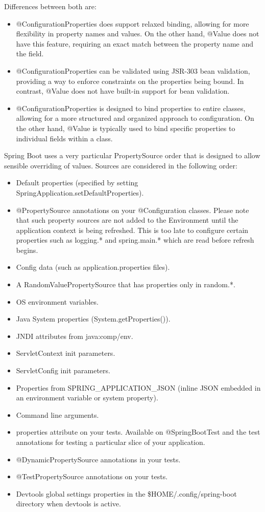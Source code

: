 \documentclass{scrartcl}
\begin{document}
Differences between both are:

\begin{itemize}
    \item @ConfigurationProperties does support relaxed binding, allowing for more flexibility in property names and values. On the other hand, @Value does not have this feature, requiring an exact match between the property name and the field.
    \item @ConfigurationProperties can be validated using JSR-303 bean validation, providing a way to enforce constraints on the properties being bound. In contrast, @Value does not have built-in support for bean validation.
    \item @ConfigurationProperties is designed to bind properties to entire classes, allowing for a more structured and organized approach to configuration. On the other hand, @Value is typically used to bind specific properties to individual fields within a class.
\end{itemize}

Spring Boot uses a very particular PropertySource order that is designed to allow sensible overriding of values. Sources are considered in the following order:

\begin{itemize}
    \item Default properties (specified by setting SpringApplication.setDefaultProperties).
    \item @PropertySource annotations on your @Configuration classes. Please note that such property sources are not added to the Environment until the application context is being refreshed. This is too late to configure certain properties such as logging.* and spring.main.* which are read before refresh begins.
    \item Config data (such as application.properties files).
    \item A RandomValuePropertySource that has properties only in random.*.
    \item OS environment variables.
    \item Java System properties (System.getProperties()).
    \item JNDI attributes from java:comp/env.
    \item ServletContext init parameters.
    \item ServletConfig init parameters.
    \item Properties from SPRING\_APPLICATION\_JSON (inline JSON embedded in an environment variable or system property).
    \item Command line arguments.
    \item properties attribute on your tests. Available on @SpringBootTest and the test annotations for testing a particular slice of your application.
    \item @DynamicPropertySource annotations in your tests.
    \item @TestPropertySource annotations on your tests.
    \item Devtools global settings properties in the \$HOME/.config/spring-boot directory when devtools is active.
\end{itemize}
\end{document}
